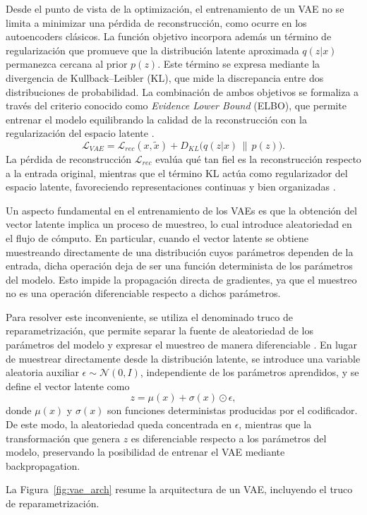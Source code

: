 Desde el punto de vista de la optimización, el entrenamiento de un VAE no se limita a minimizar una pérdida de reconstrucción, como ocurre en los autoencoders clásicos. La función objetivo incorpora además un término de regularización que promueve que la distribución latente aproximada $q(z|x)$ permanezca cercana al prior $p(z)$. Este término se expresa mediante la divergencia de Kullback--Leibler (KL), que mide la discrepancia entre dos distribuciones de probabilidad. La combinación de ambos objetivos se formaliza a través del criterio conocido como \textit{Evidence Lower Bound} (ELBO), que permite entrenar el modelo equilibrando la calidad de la reconstrucción con la regularización del espacio latente \cite{kingma2013auto}.
\[
\mathcal{L}_{VAE} =
\mathcal{L}_{rec}(x, \tilde{x}) +
D_{KL}\big(q(z|x)\,\|\,p(z)\big).
\]
La pérdida de reconstrucción $\mathcal{L}_{rec}$ evalúa qué tan fiel es la reconstrucción respecto a la entrada original, mientras que el término KL actúa como regularizador del espacio latente, favoreciendo representaciones continuas y bien organizadas \cite{doersch2016tutorial}.

Un aspecto fundamental en el entrenamiento de los VAEs es que la obtención del vector latente implica un proceso de muestreo, lo cual introduce aleatoriedad en el flujo de cómputo. En particular, cuando el vector latente se obtiene muestreando directamente de una distribución cuyos parámetros dependen de la entrada, dicha operación deja de ser una función determinista de los parámetros del modelo. Esto impide la propagación directa de gradientes, ya que el muestreo no es una operación diferenciable respecto a dichos parámetros.

Para resolver este inconveniente, se utiliza el denominado truco de reparametrización, que permite separar la fuente de aleatoriedad de los parámetros del modelo y expresar el muestreo de manera diferenciable \cite{kingma2013auto}. En lugar de muestrear directamente desde la distribución latente, se introduce una variable aleatoria auxiliar $\epsilon \sim \mathcal{N}(0, I)$, independiente de los parámetros aprendidos, y se define el vector latente como
\[
z = \mu(x) + \sigma(x) \odot \epsilon,
\]
donde $\mu(x)$ y $\sigma(x)$ son funciones deterministas producidas por el codificador. De este modo, la aleatoriedad queda concentrada en $\epsilon$, mientras que la transformación que genera $z$ es diferenciable respecto a los parámetros del modelo, preservando la posibilidad de entrenar el VAE mediante backpropagation.

La Figura~\ref{fig:vae_arch} resume la arquitectura de un VAE, incluyendo el truco de reparametrización.

